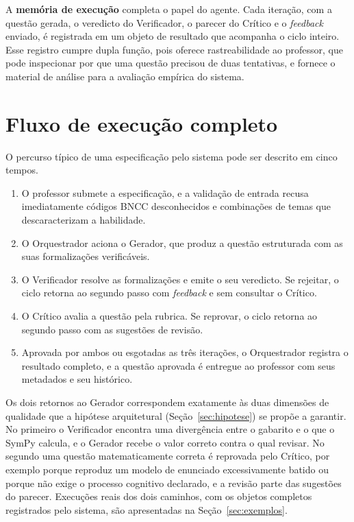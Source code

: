 A \textbf{memória de execução} completa o papel do agente. Cada iteração, com a questão gerada, o
veredicto do Verificador, o parecer do Crítico e o \emph{feedback} enviado, é registrada em um
objeto de resultado que acompanha o ciclo inteiro. Esse registro cumpre dupla função, pois oferece
rastreabilidade ao professor, que pode inspecionar por que uma questão precisou de duas tentativas,
e fornece o material de análise para a avaliação empírica do sistema.

\section{Fluxo de execução completo}
\label{sec:fluxo}

O percurso típico de uma especificação pelo sistema pode ser descrito em cinco tempos.

\begin{enumerate}
\item O professor submete a especificação, e a validação de entrada recusa imediatamente códigos
  BNCC desconhecidos e combinações de temas que descaracterizam a habilidade.
\item O Orquestrador aciona o Gerador, que produz a questão estruturada com as suas formalizações
  verificáveis.
\item O Verificador resolve as formalizações e emite o seu veredicto. Se rejeitar, o ciclo retorna
  ao segundo passo com \emph{feedback} e sem consultar o Crítico.
\item O Crítico avalia a questão pela rubrica. Se reprovar, o ciclo retorna ao segundo passo com as
  sugestões de revisão.
\item Aprovada por ambos ou esgotadas as três iterações, o Orquestrador registra o resultado
  completo, e a questão aprovada é entregue ao professor com seus metadados e seu histórico.
\end{enumerate}

Os dois retornos ao Gerador correspondem exatamente às duas dimensões de qualidade que a hipótese
arquitetural (Seção~\ref{sec:hipotese}) se propõe a garantir. No primeiro o Verificador encontra
uma divergência entre o gabarito e o que o SymPy calcula, e o Gerador recebe o valor correto contra
o qual revisar. No segundo uma questão matematicamente correta é reprovada pelo Crítico, por
exemplo porque reproduz um modelo de enunciado excessivamente batido ou porque não exige o processo
cognitivo declarado, e a revisão parte das sugestões do parecer. Execuções reais dos dois caminhos,
com os objetos completos registrados pelo sistema, são apresentadas na
Seção~\ref{sec:exemplos}.

